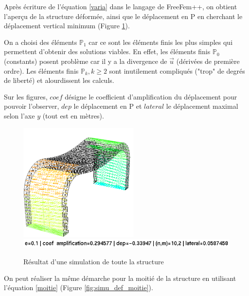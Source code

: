     Après écriture de l'équation \ref{varia} dans le langage de FreeFem++, on obtient  
    l'aperçu de la structure déformée, ainsi que le déplacement en P en cherchant le déplacement vertical minimum (Figure \ref{fig:simu_def}).

    On a choisi des éléments $\mathbb{P}_1$ car ce sont les éléments finis les plus simples qui permettent d'obtenir des solutions viables.
    En effet, les éléments finis $\mathbb{P}_0$ (constants) posent problème car il y a la divergence de $\vec{u}$ (dérivées de première ordre).
    Les éléments finis $\mathbb{P}_k, k \geq 2$ sont inutilement compliqués ("trop" de degrés de liberté) et alourdissent les calculs.

    Sur les figures, $coef$ désigne le coefficient d'amplification du déplacement pour pouvoir l'observer, $dep$ le déplacement en P et $lateral$ 
    le déplacement maximal selon l'axe $y$ (tout est en mètres).
    
    \begin{figure}        
        \begin{center}
        
            \includegraphics[width=6cm]{imgs/all_simu.PNG}
            \includegraphics[width=12cm]{imgs/all_simu_label.PNG}
            \caption{Résultat d'une simulation de toute la structure}
            \label{fig:simu_def}
        
        \end{center}
    \end{figure}

    On peut réaliser la même démarche pour la moitié de la structure en utilisant l'équation \ref{moitie} (Figure \ref{fig:simu_def_moitie}).

